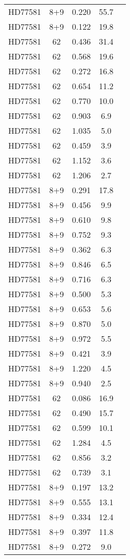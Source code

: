 \begin{table*}
\begin{tabular}{l c c c c}
HD77581 & 8+9 & 0.220 & 55.7\\ 
HD77581 & 8+9 & 0.122 & 19.8\\ 
HD77581 & 62 & 0.436 & 31.4\\ 
HD77581 & 62 & 0.568 & 19.6\\ 
HD77581 & 62 & 0.272 & 16.8\\ 
HD77581 & 62 & 0.654 & 11.2\\ 
HD77581 & 62 & 0.770 & 10.0\\ 
HD77581 & 62 & 0.903 & 6.9\\ 
HD77581 & 62 & 1.035 & 5.0\\ 
HD77581 & 62 & 0.459 & 3.9\\ 
HD77581 & 62 & 1.152 & 3.6\\ 
HD77581 & 62 & 1.206 & 2.7\\ 
HD77581 & 8+9 & 0.291 & 17.8\\ 
HD77581 & 8+9 & 0.456 & 9.9\\ 
HD77581 & 8+9 & 0.610 & 9.8\\ 
HD77581 & 8+9 & 0.752 & 9.3\\ 
HD77581 & 8+9 & 0.362 & 6.3\\ 
HD77581 & 8+9 & 0.846 & 6.5\\ 
HD77581 & 8+9 & 0.716 & 6.3\\ 
HD77581 & 8+9 & 0.500 & 5.3\\ 
HD77581 & 8+9 & 0.653 & 5.6\\ 
HD77581 & 8+9 & 0.870 & 5.0\\ 
HD77581 & 8+9 & 0.972 & 5.5\\ 
HD77581 & 8+9 & 0.421 & 3.9\\ 
HD77581 & 8+9 & 1.220 & 4.5\\ 
HD77581 & 8+9 & 0.940 & 2.5\\ 
HD77581 & 62 & 0.086 & 16.9\\ 
HD77581 & 62 & 0.490 & 15.7\\ 
HD77581 & 62 & 0.599 & 10.1\\ 
HD77581 & 62 & 1.284 & 4.5\\ 
HD77581 & 62 & 0.856 & 3.2\\ 
HD77581 & 62 & 0.739 & 3.1\\ 
HD77581 & 8+9 & 0.197 & 13.2\\ 
HD77581 & 8+9 & 0.555 & 13.1\\ 
HD77581 & 8+9 & 0.334 & 12.4\\ 
HD77581 & 8+9 & 0.397 & 11.8\\ 
HD77581 & 8+9 & 0.272 & 9.0\\ 

\end{tabular}
\end{table*}
